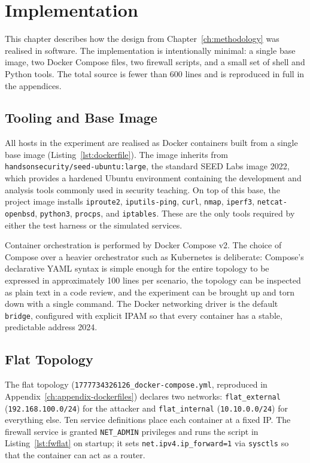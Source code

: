 \chapter{Implementation}
\label{ch:implementation}

This chapter describes how the design from Chapter~\ref{ch:methodology} was realised in software. The implementation is intentionally minimal: a single base image, two Docker Compose files, two firewall scripts, and a small set of shell and Python tools. The total source is fewer than 600 lines and is reproduced in full in the appendices.

\section{Tooling and Base Image}

All hosts in the experiment are realised as Docker containers built from a single base image (Listing~\ref{lst:dockerfile}). The image inherits from \texttt{handsonsecurity/seed-ubuntu:large}, the standard SEED Labs image \parencite{Du}{2022}, which provides a hardened Ubuntu environment containing the development and analysis tools commonly used in security teaching. On top of this base, the project image installs \texttt{iproute2}, \texttt{iputils-ping}, \texttt{curl}, \texttt{nmap}, \texttt{iperf3}, \texttt{netcat-openbsd}, \texttt{python3}, \texttt{procps}, and \texttt{iptables}. These are the only tools required by either the test harness or the simulated services.

Container orchestration is performed by Docker Compose v2. The choice of Compose over a heavier orchestrator such as Kubernetes is deliberate: Compose's declarative YAML syntax is simple enough for the entire topology to be expressed in approximately 100 lines per scenario, the topology can be inspected as plain text in a code review, and the experiment can be brought up and torn down with a single command. The Docker networking driver is the default \texttt{bridge}, configured with explicit IPAM so that every container has a stable, predictable address \parencite{Docker Inc.}{2024}.

\section{Flat Topology}

The flat topology (\texttt{1777734326126\_docker-compose.yml}, reproduced in Appendix~\ref{ch:appendix-dockerfiles}) declares two networks: \texttt{flat\_external} (\texttt{192.168.100.0/24}) for the attacker and \texttt{flat\_internal} (\texttt{10.10.0.0/24}) for everything else. Ten service definitions place each container at a fixed IP. The firewall service is granted \texttt{NET\_ADMIN} privileges and runs the script in Listing~\ref{lst:fwflat} on startup; it sets \texttt{net.ipv4.ip\_forward=1} via \texttt{sysctls} so that the container can act as a router.

